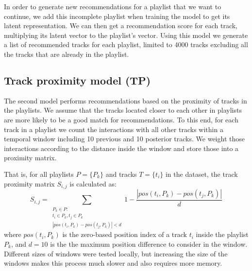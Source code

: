 In order to generate new recommendations for a playlist that we want to continue, we add this incomplete playlist when training the model to get its latent representation. We can then get a recommendation score for each track, multiplying its latent vector to the playlist's vector. Using this model we generate a list of recommended tracks for each playlist, limited to 4000 tracks excluding all the tracks that are already in the playlist.


\subsection{Track proximity model (TP)}


The second model performs recommendations based on the proximity of tracks in the playlists. We assume that the tracks located closer to each other in playlists are more likely to be a good match for recommendations. To this end, for each track in a playlist we count the interactions with all other tracks within a temporal window including 10 previous and 10 posterior tracks. We weight those interactions according to the distance inside the window and store those into a proximity matrix. 

That is, for all playlists $P = \{ P_{k} \}$ and tracks $T = \{ t_{i} \}$ in the dataset, the track proximity matrix $S_{i,j}$ is calculated as: 
\begin{displaymath}
  S_{i,j} = \sum_{\substack{P_{k} \in P :\\ t_{i} \in P_{k} , t_{j} \in P_{k} \\ |pos(t_{i}, P_{k}) - pos(t_{j},P_{k})| < d}} 1 - \frac{ |pos(t_{i}, P_{k}) - pos(t_{j},P_{k})|}{d}
\end{displaymath}
where $pos(t_{i}, P_{k})$ is the zero-based position index of a track $t_{i}$ inside the playlist $P_{k}$, and $d=10$ is the the maximum position difference to consider in the window. Different sizes of windows were tested locally, but increasing the size of the windows makes this process much slower and also requires more memory.

\iffalse
\begin{algorithm}
    \SetKwInOut{Input}{Input}
    \SetKwInOut{Output}{Output}
    \underline{Function fill\_proximity\_matrix} $(ps)$\;
    \Input{List with all playlists $ps$}
    \Output{track proximity matrix $c\_matrix$}
    \For{$p$ in $ps$}{
    $current\_windows$ = [] \\
    \For{$track\_x$ in $p$}{
    $distance$ = 1 \\
    \For{$t$ in $current\_windows$}{
    $c\_matrix$[$track\_x$][$t$] += $distance$ / 10 \\
    $c\_matrix$[$t$][$track\_x$] += $distance$ / 10 \\
    $distance$ += 1 \\
    }
    \If{len($current\_windows$) == 10}
      {
        $current\_windows$.pop()
       }
       $current\_windows$.push($track\_x$)
    }
    }
    \caption{Function to calculate the proximity of tracks in the playlists weighted by proximity.}
    \label{alg:fill}
\end{algorithm}
\fi

